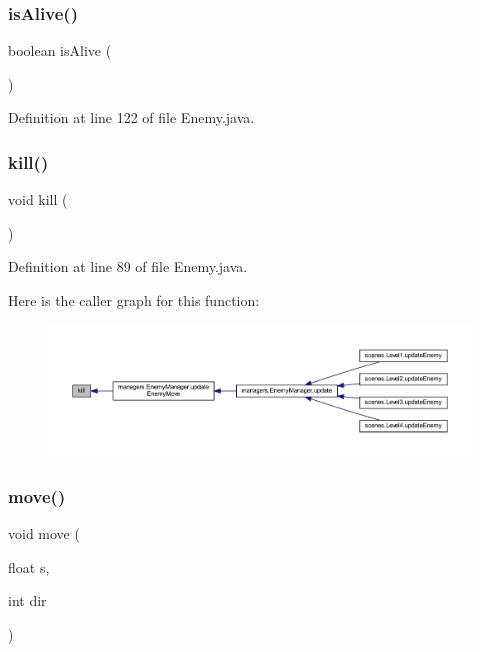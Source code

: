 \subsubsection{\texorpdfstring{is\+Alive()}{isAlive()}}
{\footnotesize\ttfamily boolean is\+Alive (\begin{DoxyParamCaption}{ }\end{DoxyParamCaption})}



Definition at line 122 of file Enemy.\+java.

\mbox{\label{classenemies_1_1_enemy_aae9d52caad9fb2892deeb25596cfd2ab}} 
\subsubsection{\texorpdfstring{kill()}{kill()}}
{\footnotesize\ttfamily void kill (\begin{DoxyParamCaption}{ }\end{DoxyParamCaption})}



Definition at line 89 of file Enemy.\+java.

Here is the caller graph for this function\+:\nopagebreak
\begin{figure}[H]
\begin{center}
\leavevmode
\includegraphics[width=350pt]{classenemies_1_1_enemy_aae9d52caad9fb2892deeb25596cfd2ab_icgraph}
\end{center}
\end{figure}
\mbox{\label{classenemies_1_1_enemy_a474fd9bb876d55f65850132777c539d8}} 
\subsubsection{\texorpdfstring{move()}{move()}}
{\footnotesize\ttfamily void move (\begin{DoxyParamCaption}\item[{float}]{s,  }\item[{int}]{dir }\end{DoxyParamCaption})}



